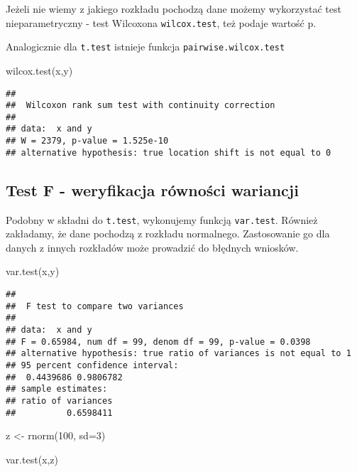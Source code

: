 \documentclass[
]{book}
\newenvironment{Shaded}{\begin{snugshade}}{\end{snugshade}}
\newcommand{\AttributeTok}[1]{\textcolor[rgb]{0.77,0.63,0.00}{#1}}
\newcommand{\DecValTok}[1]{\textcolor[rgb]{0.00,0.00,0.81}{#1}}
\newcommand{\FunctionTok}[1]{\textcolor[rgb]{0.00,0.00,0.00}{#1}}
\newcommand{\NormalTok}[1]{#1}
\newcommand{\OtherTok}[1]{\textcolor[rgb]{0.56,0.35,0.01}{#1}}
\begin{document}
Jeżeli nie wiemy z jakiego rozkładu pochodzą dane możemy wykorzystać test nieparametryczny - test Wilcoxona \texttt{wilcox.test}, też podaje wartość p.

Analogicznie dla \texttt{t.test} istnieje funkcja \texttt{pairwise.wilcox.test}

\begin{Shaded}
\begin{Highlighting}[]
\FunctionTok{wilcox.test}\NormalTok{(x,y)}
\end{Highlighting}
\end{Shaded}

\begin{verbatim}
## 
##  Wilcoxon rank sum test with continuity correction
## 
## data:  x and y
## W = 2379, p-value = 1.525e-10
## alternative hypothesis: true location shift is not equal to 0
\end{verbatim}

\hypertarget{test-f---weryfikacja-ruxf3wnoux15bci-wariancji}{%
\subsection{Test F - weryfikacja równości wariancji}\label{test-f---weryfikacja-ruxf3wnoux15bci-wariancji}}

Podobny w składni do \texttt{t.test}, wykonujemy funkcją \texttt{var.test}. Również zakładamy, że dane pochodzą z rozkładu normalnego. Zastosowanie go dla danych z innych rozkładów może prowadzić do błędnych wniosków.

\begin{Shaded}
\begin{Highlighting}[]
\FunctionTok{var.test}\NormalTok{(x,y)}
\end{Highlighting}
\end{Shaded}

\begin{verbatim}
## 
##  F test to compare two variances
## 
## data:  x and y
## F = 0.65984, num df = 99, denom df = 99, p-value = 0.0398
## alternative hypothesis: true ratio of variances is not equal to 1
## 95 percent confidence interval:
##  0.4439686 0.9806782
## sample estimates:
## ratio of variances 
##          0.6598411
\end{verbatim}

\begin{Shaded}
\begin{Highlighting}[]
\NormalTok{z }\OtherTok{\textless{}{-}} \FunctionTok{rnorm}\NormalTok{(}\DecValTok{100}\NormalTok{, }\AttributeTok{sd=}\DecValTok{3}\NormalTok{)}

\FunctionTok{var.test}\NormalTok{(x,z)}
\end{Highlighting}
\end{Shaded}
\end{document}
